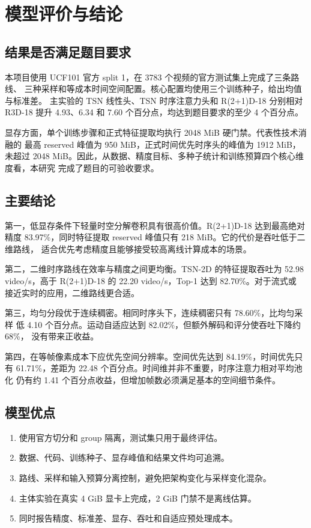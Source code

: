 \section{模型评价与结论}

\subsection{结果是否满足题目要求}

本项目使用 UCF101 官方 split 1，在 3783 个视频的官方测试集上完成了三条路线、
三种采样和等成本时间空间配置。核心配置均使用三个训练种子，给出均值与标准差。
主实验的 TSN 线性头、TSN 时序注意力头和 R(2+1)D-18 分别相对 R3D-18 提升
4.93、6.34 和 7.60 个百分点，均达到题目要求的至少 4 个百分点。

显存方面，单个训练步骤和正式特征提取均执行 2048 MiB 硬门禁。代表性技术消融的
最高 reserved 峰值为 950 MiB，正式时间优先时序头的峰值为 1912 MiB，未超过
2048 MiB。因此，从数据、精度目标、多种子统计和训练预算四个核心维度看，本研究
完成了题目的可验收要求。

\subsection{主要结论}

第一，低显存条件下轻量时空分解卷积具有很高价值。R(2+1)D-18 达到最高绝对精度
83.97\%，同时特征提取 reserved 峰值只有 218 MiB。它的代价是吞吐低于二维路线，
适合优先考虑精度且能够接受较高离线计算成本的场景。

第二，二维时序路线在效率与精度之间更均衡。TSN-2D 的特征提取吞吐为 52.98
video/s，高于 R(2+1)D-18 的 22.20 video/s，Top-1 达到 82.70\%。对于流式或
接近实时的应用，二维路线更合适。

第三，均匀分段优于连续稠密。相同时序头下，连续稠密只有 78.60\%，比均匀采样
低 4.10 个百分点。运动自适应达到 82.02\%，但额外解码和评分使吞吐下降约 68\%，
没有带来正收益。

第四，在等帧像素成本下应优先空间分辨率。空间优先达到 84.19\%，时间优先只有
61.71\%，差距为 22.48 个百分点。时间维并非不重要，时序注意力相对平均池化
仍有约 1.41 个百分点收益，但增加帧数必须满足基本的空间细节条件。

\subsection{模型优点}

\begin{enumerate}
  \item 使用官方切分和 group 隔离，测试集只用于最终评估。
  \item 数据、代码、训练种子、显存峰值和结果文件均可追溯。
  \item 路线、采样和输入预算分离控制，避免把架构变化与采样变化混杂。
  \item 主体实验在真实 4 GiB 显卡上完成，2 GiB 门禁不是离线估算。
  \item 同时报告精度、标准差、显存、吞吐和自适应预处理成本。
\end{enumerate}


